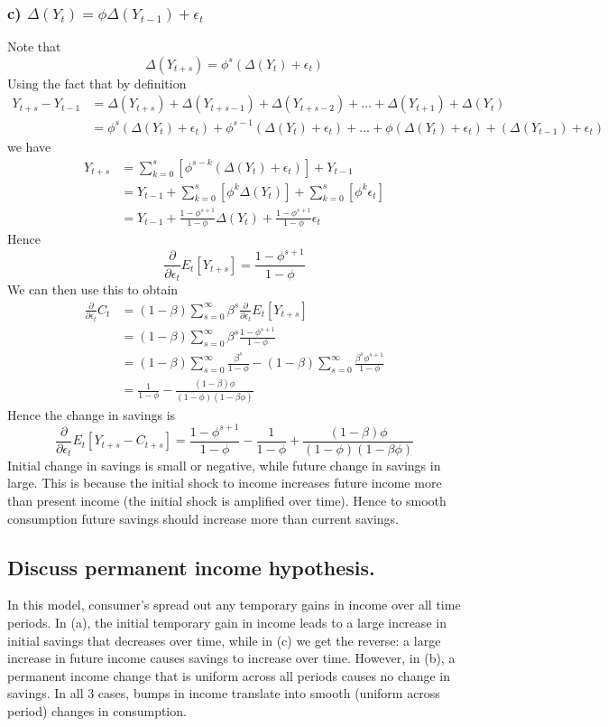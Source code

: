 \documentclass[11pt]{amsart}
\begin{document}
\subsubsection*{c) $\Delta(Y_t) = \phi\Delta(Y_{t-1}) + \epsilon_t$}
Note that \[
\Delta(Y_{t+s}) = \phi^s(\Delta(Y_t) + \epsilon_t)
\]
Using the fact that by definition
\begin{align*}
	Y_{t+s} - Y_{t-1} &= \Delta(Y_{t+s}) + \Delta(Y_{t+s-1}) + \Delta(Y_{t+s-2}) + \ldots + \Delta(Y_{t+1}) + \Delta(Y_{t}) \\
	&= \phi^s(\Delta(Y_t) + \epsilon_t) + \phi^{s-1}(\Delta(Y_t) + \epsilon_t) + \ldots + \phi(\Delta(Y_t) + \epsilon_t) + (\Delta(Y_{t-1}) + \epsilon_t)
\end{align*}
we have
\begin{align*}
	Y_{t+s} &= \sum_{k=0}^s \left[ \phi^{s-k} (\Delta(Y_t) + \epsilon_t) \right] + Y_{t-1} \\
	&= Y_{t-1} + \sum_{k=0}^s \left[ \phi^{k} \Delta(Y_t) \right] + \sum_{k=0}^s \left[ \phi^{k} \epsilon_t \right] \\
	&= Y_{t-1} + \frac{1 - \phi^{s+1}}{1 - \phi} \Delta(Y_t) + \frac{1 - \phi^{s+1}}{1 - \phi} \epsilon_t
\end{align*}
Hence
\[
\frac{\partial}{\partial \epsilon_t} E_t [Y_{t+s}] = \frac{1 - \phi^{s+1}}{1 - \phi}
\]
We can then use this to obtain
\begin{align*}
	\frac{\partial}{\partial \epsilon_t} C_t &= (1-\beta) \sum_{s=0}^\infty \beta^s \frac{\partial}{\partial \epsilon_t} E_t [Y_{t+s}] \\
	&= (1-\beta) \sum_{s=0}^\infty \beta^s \frac{1 - \phi^{s+1}}{1 - \phi} \\
	&= (1-\beta) \sum_{s=0}^\infty \frac{\beta^s}{1 - \phi} - (1-\beta) \sum_{s=0}^\infty \frac{\beta^s\phi^{s+1}}{1 - \phi} \\
	&= \frac{1}{1-\phi} - \frac{(1-\beta) \phi}{(1-\phi)(1-\beta\phi)}
\end{align*}
Hence the change in savings is
\[
\frac{\partial}{\partial \epsilon_t} E_t [Y_{t+s} - C_{t+s}] = \frac{1 - \phi^{s+1}}{1 - \phi} - \frac{1}{1-\phi} + \frac{(1-\beta) \phi}{(1-\phi)(1-\beta\phi)}
\]
Initial change in savings is small or negative, while future change in savings in large. This is because the initial shock to income increases future income more than present income (the initial shock is amplified over time). Hence to smooth consumption future savings should increase more than current savings.

\subsection{Discuss permanent income hypothesis.} In this model, consumer's spread out any temporary gains in income over all time periods. In (a), the initial temporary gain in income leads to a large increase in initial savings that decreases over time, while in (c) we get the reverse: a large increase in future income causes savings to increase over time. However, in (b), a permanent income change that is uniform across all periods causes no change in savings. In all 3 cases, bumps in income translate into smooth (uniform across period) changes in consumption.
\end{document}

